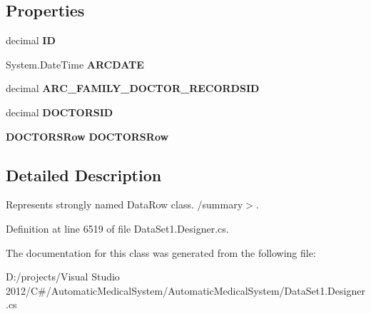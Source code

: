 \subsection*{Properties}
\begin{CompactItemize}
\item 
decimal \textbf{ID}\hspace{0.3cm}{\tt  [get, set]}\label{class_automatic_medical_system_1_1_data_set1_1_1_a_r_c___s_p___d_o_c_t_o_r___r_e_c_o_r_d_s_row_fbd6aae34e29ff5c67bf4cab539f20f7}

\item 
System.DateTime \textbf{ARCDATE}\hspace{0.3cm}{\tt  [get, set]}\label{class_automatic_medical_system_1_1_data_set1_1_1_a_r_c___s_p___d_o_c_t_o_r___r_e_c_o_r_d_s_row_f3d72d59c580f4817b7de7c52b79522a}

\item 
decimal \textbf{ARC\_\-FAMILY\_\-DOCTOR\_\-RECORDSID}\hspace{0.3cm}{\tt  [get, set]}\label{class_automatic_medical_system_1_1_data_set1_1_1_a_r_c___s_p___d_o_c_t_o_r___r_e_c_o_r_d_s_row_0931fc4d7a1065826f41dc1be3577280}

\item 
decimal \textbf{DOCTORSID}\hspace{0.3cm}{\tt  [get, set]}\label{class_automatic_medical_system_1_1_data_set1_1_1_a_r_c___s_p___d_o_c_t_o_r___r_e_c_o_r_d_s_row_831e570581c17bf1dbd3c4a04d3bdb17}

\item 
{\bf DOCTORSRow} \textbf{DOCTORSRow}\hspace{0.3cm}{\tt  [get, set]}\label{class_automatic_medical_system_1_1_data_set1_1_1_a_r_c___s_p___d_o_c_t_o_r___r_e_c_o_r_d_s_row_bfbf646d5171d92a8249ba8529e42cd3}

\end{CompactItemize}


\subsection{Detailed Description}
Represents strongly named DataRow class. /summary$>$. 

Definition at line 6519 of file DataSet1.Designer.cs.

The documentation for this class was generated from the following file:\begin{CompactItemize}
\item 
D:/projects/Visual Studio 2012/C\#/AutomaticMedicalSystem/AutomaticMedicalSystem/DataSet1.Designer.cs\end{CompactItemize}
